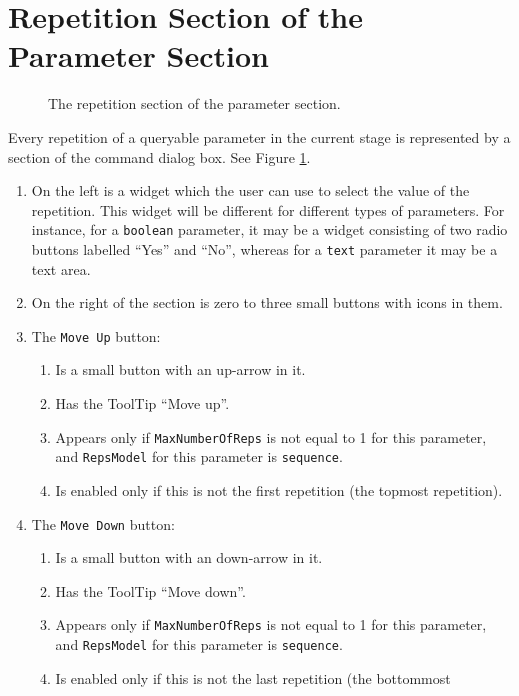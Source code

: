 \documentclass[11pt]{article}
\begin{document}
\section{Repetition Section of the Parameter Section}

\begin{figure}

\centerline{\epsfxsize=5.5in }

\caption{
  The repetition section of the parameter section.
}
\label{repetitionSectionFig}
\end{figure}

Every repetition of a queryable parameter in the current stage is
represented by a section of the command dialog box.  See Figure
\ref{repetitionSectionFig}.
\begin{enumerate}
\item On the left is a widget which the user can use to select the
  value of the repetition.  This widget will be different for different
  types of parameters.  For instance, for a {\tt boolean} parameter,
  it may be a widget consisting of two radio buttons labelled ``Yes''
  and ``No'', whereas for a {\tt text} parameter it may be a
  text area.
\item On the right of the section is zero to three small buttons
  with icons in them.
\item The {\tt Move Up} button:
  \begin{enumerate}
  \item Is a small button with an up-arrow in it.
  \item Has the ToolTip ``Move up''.
  \item Appears only if
    {\tt MaxNumberOfReps} is not equal to 1 for this parameter, and
    {\tt RepsModel} for this parameter is {\tt sequence}.
  \item Is enabled only if this is not the first repetition (the topmost
    repetition).
  \end{enumerate}
\item The {\tt Move Down} button:
  \begin{enumerate}
  \item Is a small button with an down-arrow in it.
  \item Has the ToolTip ``Move down''.
  \item Appears only if
    {\tt MaxNumberOfReps} is not equal to 1 for this parameter, and
    {\tt RepsModel} for this parameter is {\tt sequence}.
  \item Is enabled only if this is not the last repetition (the bottommost

\end{enumerate}
\end{enumerate}
\end{document}
